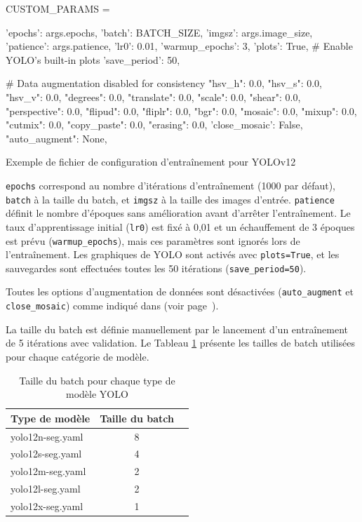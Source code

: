 \begin{code}[H]
    \begin{pythoncode}
    CUSTOM_PARAMS = {
        'epochs': args.epochs,
        'batch': BATCH_SIZE,
        'imgsz': args.image_size,
        'patience': args.patience,
        'lr0': 0.01,
        'warmup_epochs': 3,
        'plots': True,  # Enable YOLO's built-in plots
        'save_period': 50,
        
        # Data augmentation disabled for consistency
        "hsv_h": 0.0,
        "hsv_s": 0.0,
        "hsv_v": 0.0,
        "degrees": 0.0,
        "translate": 0.0,
        "scale": 0.0,
        "shear": 0.0,
        "perspective": 0.0,
        "flipud": 0.0,
        "fliplr": 0.0,
        "bgr": 0.0,
        "mosaic": 0.0,
        "mixup": 0.0,
        "cutmix": 0.0,
        "copy_paste": 0.0,
        "erasing": 0.0,
        'close_mosaic': False,
        "auto_augment": None,
    }
    \end{pythoncode}
    \caption{Exemple de fichier de configuration d'entraînement pour YOLOv12}
    \label{code:ch36_entrainement_config_yolo}
\end{code}

\texttt{epochs} correspond au nombre d'itérations d'entraînement (1000 par défaut), \texttt{batch} à la taille du batch, et \texttt{imgsz} à la taille des images d'entrée. \texttt{patience} définit le nombre d'époques sans amélioration avant d'arrêter l'entraînement. Le taux d'apprentissage initial (\texttt{lr0}) est fixé à 0,01 et un échauffement de 3 époques est prévu (\texttt{warmup\_epochs}), mais ces paramètres sont ignorés lors de l'entraînement. Les graphiques de YOLO sont activés avec \texttt{plots=True}, et les sauvegardes sont effectuées toutes les 50 itérations (\texttt{save\_period=50}).

Toutes les options d'augmentation de données sont désactivées (\texttt{auto\_augment} et \texttt{close\_mosaic}) comme indiqué dans \textit{} (voir page~\pageref{subsubsec:augmentation_donnees}).

La taille du batch est définie manuellement par le lancement d'un entraînement de 5 itérations avec validation. Le Tableau \ref{tab:ch36_batch_size_yolo} présente les tailles de batch utilisées pour chaque catégorie de modèle.

\begin{table}[H]
    \centering
    \begin{tabular}{@{}lcc@{}}
    \toprule
    \textbf{Type de modèle} & \textbf{Taille du batch} \\
    \midrule
    yolo12n-seg.yaml & 8 \\
    yolo12s-seg.yaml & 4 \\
    yolo12m-seg.yaml & 2 \\
    yolo12l-seg.yaml & 2 \\
    yolo12x-seg.yaml & 1 \\
    \bottomrule
    \end{tabular}
    \caption{Taille du batch pour chaque type de modèle YOLO}
    \label{tab:ch36_batch_size_yolo}
\end{table}


